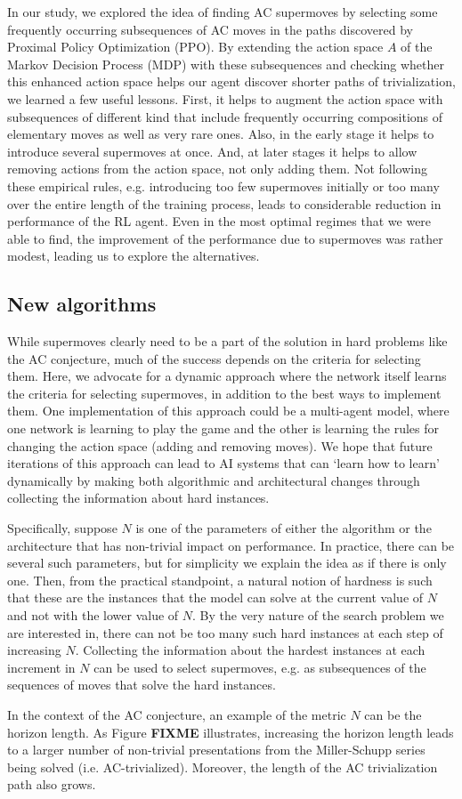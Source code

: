 In our study, we explored the idea of finding AC supermoves by selecting some frequently occurring subsequences of AC moves in the paths discovered by Proximal Policy Optimization (PPO). By extending the action space $A$ of the Markov Decision Process (MDP) with these subsequences and checking whether this enhanced action space helps our agent discover shorter paths of trivialization, we learned a few useful lessons. First, it helps to augment the action space with subsequences of different kind that include frequently occurring compositions of elementary moves as well as very rare ones. Also, in the early stage it helps to introduce several supermoves at once. And, at later stages it helps to allow removing actions from the action space, not only adding them. Not following these empirical rules, e.g. introducing too few supermoves initially or too many over the entire length of the training process, leads to considerable reduction in performance of the RL agent. Even in the most optimal regimes that we were able to find, the improvement of the performance due to supermoves was rather modest, leading us to explore the alternatives.

\subsection{New algorithms}

While supermoves clearly need to be a part of the solution in hard problems like the AC conjecture, much of the success depends on the criteria for selecting them. Here, we advocate for a dynamic approach where the network itself learns the criteria for selecting supermoves, in addition to the best ways to implement them. One implementation of this approach could be a multi-agent model, where one network is learning to play the game and the other is learning the rules for changing the action space (adding and removing moves). We hope that future iterations of this approach can lead to AI systems that can `learn how to learn' dynamically by making both algorithmic and architectural changes through collecting the information about hard instances.

Specifically, suppose $N$ is one of the parameters of either the algorithm or the architecture that has non-trivial impact on performance. In practice, there can be several such parameters, but for simplicity we explain the idea as if there is only one. Then, from the practical standpoint, a natural notion of hardness is such that these are the instances that the model can solve at the current value of $N$ and not with the lower value of $N$. By the very nature of the search problem we are interested in, there can not be too many such hard instances at each step of increasing $N$. Collecting the information about the hardest instances at each increment in $N$ can be used to select supermoves, e.g. as subsequences of the sequences of moves that solve the hard instances.

In the context of the AC conjecture, an example of the metric $N$ can be the horizon length. As Figure {\bf FIXME} illustrates, increasing the horizon length leads to a larger number of non-trivial presentations from the Miller-Schupp series being solved (i.e. AC-trivialized). Moreover, the length of the AC trivialization path also grows.
